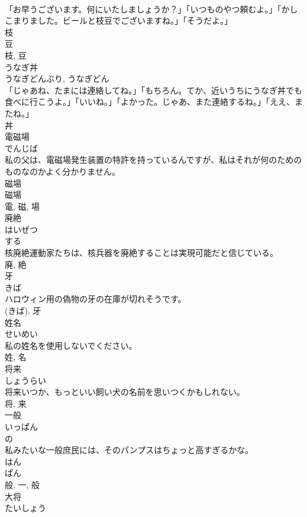 \documentclass[8pt]{extreport}
\begin{document}
\begin{CJK}{UTF8}{min}
\\	「お早うございます。何にいたしましょうか？」「いつものやつ頼むよ。」「かしこまりました。ビールと枝豆でございますね。」「そうだよ。」	
\\	枝 
\\	豆 
\\	枝, 豆	
\\	うなぎ丼	
\\	うなぎどんぶり, うなぎどん	
\\	「じゃあね、たまには連絡してね。」「もちろん。てか、近いうちにうなぎ丼でも食べに行こうよ。」「いいね。」「よかった。じゃあ、また連絡するね。」「ええ、またね。」	
\\	丼	
\\	電磁場	
\\	でんじば	
\\	私の父は、電磁場発生装置の特許を持っているんですが、私はそれが何のためのものなのかよく分かりません。	
\\	磁場 
\\	磁場 
\\	電, 磁, 場	
\\	廃絶	
\\	はいぜつ	
\\	する 
\\	核廃絶運動家たちは、核兵器を廃絶することは実現可能だと信じている。	
\\	廃, 絶	
\\	牙	
\\	きば	
\\	ハロウィン用の偽物の牙の在庫が切れそうです。	
\\	(きば).	牙	
\\	姓名	
\\	せいめい	
\\	私の姓名を使用しないでください。	
\\	姓, 名	
\\	将来	
\\	しょうらい	
\\	将来いつか、もっといい飼い犬の名前を思いつくかもしれない。	
\\	将, 来	
\\	一般	
\\	いっぱん	
\\	の 
\\	私みたいな一般庶民には、そのパンプスはちょっと高すぎるかな。	
\\	はん 
\\	ぱん 
\\	般.	一, 般	
\\	大将	
\\	たいしょう	

\end{CJK}
\end{document}
